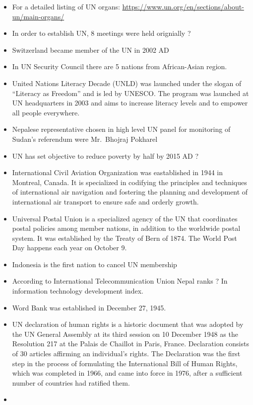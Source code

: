 \documentclass[
]{book}
\begin{document}
\begin{itemize}
\item
  For a detailed listing of UN organs: \url{https://www.un.org/en/sections/about-un/main-organs/}
\item
  In order to establish UN, 8 meetings were held orignially ?
\item
  Switzerland became member of the UN in 2002 AD
\item
  In UN Security Council there are 5 nations from African-Asian region.
\item
  United Nations Literacy Decade (UNLD) was launched under the slogan of ``Literacy as Freedom'' and is led by UNESCO. The program was launched at UN headquarters in 2003 and aims to increase literacy levels and to empower all people everywhere.
\item
  Nepalese representative chosen in high level UN panel for monitoring of Sudan's referendum were Mr.~Bhojraj Pokharel
\item
  UN has set objective to reduce poverty by half by 2015 AD ?
\item
  International Civil Aviation Organization was eastablished in 1944 in Montreal, Canada. It is specialized in codifying the principles and techniques of international air navigation and fostering the planning and development of international air transport to ensure safe and orderly growth.
\item
  Universal Postal Union is a specialized agency of the UN that coordinates postal policies among member nations, in addition to the worldwide postal system. It was established by the Treaty of Bern of 1874. The World Post Day happens each year on October 9.
\item
  Indonesia is the first nation to cancel UN membership
\item
  According to International Telecommunication Union Nepal ranks ? In information technology development index.
\item
  Word Bank was established in December 27, 1945.
\item
  UN declaration of human rights is a historic document that was adopted by the UN General Assembly at its third session on 10 December 1948 as the Resolution 217 at the Palais de Chaillot in Paris, France. Declaration consists of 30 articles affirming an individual's rights. The Declaration was the first step in the process of formulating the International Bill of Human Rights, which was completed in 1966, and came into force in 1976, after a sufficient number of countries had ratified them.
\item

\end{itemize}
\end{document}
